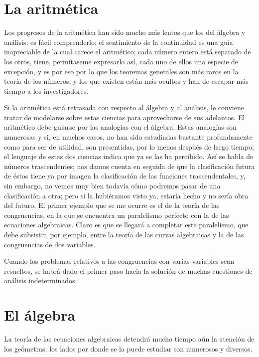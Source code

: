 \documentclass[a4paper, 12pt]{article}
\begin{document}
\section*{La aritmética}


Los progresos de la aritmética han sido mucho más lentos que los del 
álgebra y análisis; es fácil comprenderlo; el sentimiento de
la continuidad es una guía inapreciable de la cual carece el aritmético; cada número entero está separado de los otros, tiene, permítaseme expresarlo así, cada uno de ellos una especie de excepción, y es por eso por lo que los teoremas generales son más raros en
la teoría de los números, y los que existen están más
ocultos y han de escapar más tiempo a los investigadores.

Si la aritmética está retrasada con respecto al álgebra y al análisis, le conviene tratar de modelarse sobre estas ciencias para
aprovecharse de sus adelantos. El aritmético debe guiarse por las analogías con el álgebra. Estas analogías son numerosas y si, en
muchos casos, no han sido estudiadas bastante profundamente como para ser de
utilidad, son presentidas, por lo menos después de largo tiempo; el
lenguaje de estas dos ciencias indica que ya se las ha percibido. Así
se habla de números trascendentes; nos damos cuenta en seguida de que
la clasificación futura de éstos tiene ya por imagen la clasificación de las funciones trascendentales, y, sin embargo, no vemos muy bien
todavía cómo podremos pasar de una clasificación a otra; pero
si la hubiéramos visto ya, estaría hecho y no sería obra del
futuro. El primer ejemplo que se me ocurre es el de la teoría de las
congruencias, en la que se encuentra un paralelismo perfecto con la de las
ecuaciones algebraicas. Claro es que se llegará a completar este paralelismo, que
debe subsistir, por ejemplo, entre la teoría de las curvas algebraicas
y la de las congruencias de dos variables.

Cuando los problemas relativos a las congruencias con varias variables sean
resueltos, se habrá dado el primer paso hacia la solución de muchas
cuestiones de análisis indeterminados.

\section*{El álgebra}

La teoría de las ecuaciones algebraicas detendrá mucho tiempo aún la atención de los geómetras; los lados por donde se la puede
estudiar son numerosos y diversos.
\end{document}
